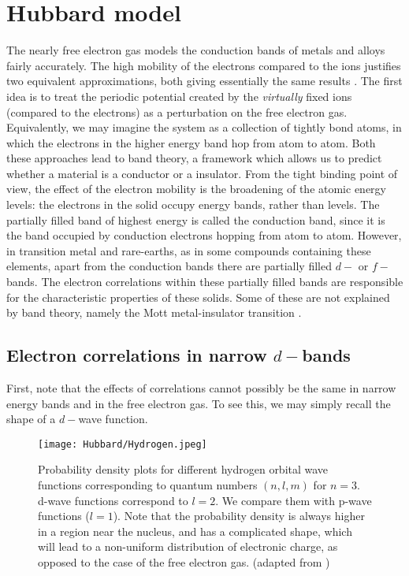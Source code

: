 \section{Hubbard model}\label{sec:hubbardModel}

The nearly free electron gas models the conduction bands of metals and alloys fairly accurately.
The high mobility of the electrons compared to the ions justifies two equivalent approximations, both giving essentially the same results \cite{ashcroft_solid_1976}.
The first idea is to treat the periodic potential created by the \emph{virtually} fixed ions (compared to the electrons) as a perturbation on the free electron gas.
Equivalently, we may imagine the system as a collection of tightly bond atoms, in which the electrons in the higher energy band hop from atom to atom.
Both these approaches lead to band theory, a framework which allows us to predict whether a material is a conductor or a insulator.
From the tight binding point of view, the effect of the electron mobility is the broadening of the atomic energy levels: the electrons in the solid occupy energy bands, rather than levels.
The partially filled band of highest energy is called the conduction band, since it is the band occupied by conduction electrons hopping from atom to atom.
However, in transition metal and rare-earths, as in some compounds containing these elements, apart from the conduction bands there are partially filled $d-$ or $f-$bands.
The electron correlations within these partially filled bands are responsible for the characteristic properties of these solids.
Some of these are not explained by band theory, namely the Mott metal-insulator transition \cite{h_de_boer_semiconductors_1937, mott_discussion_1937, mott_basis_1949}.

\subsection{Electron correlations in narrow $d-$bands}

First, note that the effects of correlations cannot possibly be the same in narrow energy bands and in the free electron gas.
To see this, we may simply recall the shape of a $d-$wave function.

\begin{figure}[H]\label{fig:hydrogenWF}
\centering
\texttt{[image: Hubbard/Hydrogen.jpeg]}
\caption[Hydrogen atomic wave functions.]{Probability density plots for different hydrogen orbital wave functions corresponding to quantum numbers $(n, l, m)$ for $n = 3$.
d-wave functions correspond to $l=2$.
We compare them with p-wave functions ($l=1$). Note that the probability density is always higher in a region near the nucleus, and has a complicated shape, which will lead to a non-uniform distribution of electronic charge, as opposed to the case of the free electron gas. (adapted from \cite{hydrogen})}
\end{figure}

